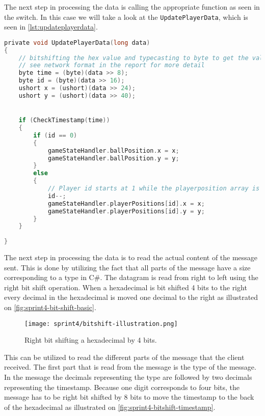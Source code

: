 \noindent 
The next step in processing the data is calling the appropriate function as seen in the switch. 
In this case we will take a look at the \texttt{UpdatePlayerData}, which is seen in \autoref{lst:updateplayerdata}.

\begin{lstlisting}[caption={Updating player data in UDP client}, captionpos=b,language=C,label={lst:updateplayerdata}]
private void UpdatePlayerData(long data)
{
    // bitshifting the hex value and typecasting to byte to get the values.
    // see network format in the report for more detail
    byte time = (byte)(data >> 8);
    byte id = (byte)(data >> 16);
    ushort x = (ushort)(data >> 24);
    ushort y = (ushort)(data >> 40);


    if (CheckTimestamp(time))
    {
        if (id == 0)
        {
            gameStateHandler.ballPosition.x = x;
            gameStateHandler.ballPosition.y = y;
        }
        else
        {
            // Player id starts at 1 while the playerposition array is 0 indexed. Decrementing id so that they line up.
            id--;
            gameStateHandler.playerPositions[id].x = x;
            gameStateHandler.playerPositions[id].y = y;
        }
    }
    
}
\end{lstlisting}
\noindent 
The next step in processing the data is to read the actual content of the message sent.
This is done by utilizing the fact that all parts of the message have a size corresponding to a type in C\#.
The datagram is read from right to left using the right bit shift operation.
When a hexadecimal is bit shifted 4 bits to the right every decimal in the hexadecimal is moved one decimal to the right as illustrated on \autoref{fig:sprint4-bit-shift-basic}.
\begin{figure}[H]
    \centering
    \texttt{[image: sprint4/bitshift-illustration.png]}
    \caption{Right bit shifting a hexadecimal by 4 bits.}
    \label{fig:sprint4-bit-shift-basic}
\end{figure}
\noindent
This can be utilized to read the different parts of the message that the client received.
The first part that is read from the message is the type of the message.
In the message the decimals representing the type are followed by two decimals representing the timestamp.
Because one digit corresponds to four bits, the message has to be right bit shifted by 8 bits to move the timestamp to the back of the hexadecimal as illustrated on \autoref{fig:sprint4-bitshift-timestamp}.
